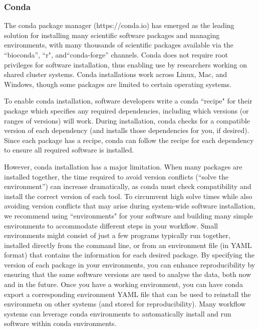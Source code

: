 \documentclass[10pt,letterpaper]{article}
\begin{document}
\begin{greybox}{\subsubsection*{Conda}

The conda package manager (https://conda.io) has emerged as the leading solution for installing many scientific software packages and managing environments, with many thousands of scientific packages available via the ``bioconda”, ``r", and``conda-forge” channels.
Conda does not require root privileges for software installation, thus enabling use by researchers working on shared cluster systems. 
Conda installations work across Linux, Mac, and Windows, though some packages are limited to certain operating systems.

To enable conda installation, software developers write a conda ``recipe" for their package which specifies any required dependencies, including which versions (or ranges of versions) will work.
During installation, conda checks for a compatible version of each dependency (and installs those dependencies for you, if desired). 
Since each package has a recipe, conda can follow the recipe for each dependency to ensure all required software is installed.

However, conda installation has a major limitation. 
When many packages are installed together, the time required to avoid version conflicts (``solve the environment”) can increase dramatically, as conda must check compatibility and install the correct version of each tool. 
To circumvent high solve times while also avoiding version conflicts that may arise during system-wide software installation, we recommend using ``environments" for your software and building many simple environments to accommodate different steps in your workflow. 
Small environments might consist of just a few programs typically run together, installed directly from the command line, or from an environment file (in YAML format) that contains the information for each desired package. 
By specifying the version of each package in your environments, you can enhance reproducibility by ensuring that the same software versions are used to analyse the data, both now and in the future.
Once you have a working environment, you can have conda export a corresponding environment YAML file that can be used to reinstall the environmetn on other systems (and stored for reproducibility). Many workflow systems can leverage conda environments to automatically install and run software within conda environments.

}
\end{greybox}
\end{document}
